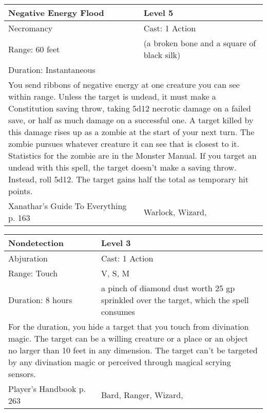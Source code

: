 \documentclass[11pt]{report}
\begin{document}
\begin{table}[H]
	\begin{tabular}{||p{6cm}|p{6cm}||}
		\hline\hline
		\bf{Negative Energy Flood} & Level 5\\ \hline
		Necromancy & Cast: 1 Action\\ \hline
		Range: 60 feet & (a broken bone and a square of black silk)\\ \hline
		Duration: Instantaneous & \\ \hline
		\multicolumn{2}{||p{12cm}||}{You send ribbons of negative energy at one creature you can see within range. Unless the target is undead, it must make a Constitution saving throw, taking 5d12 necrotic damage on a failed save, or half as much damage on a successful one. A target killed by this damage rises up as a zombie at the start of your next turn. The zombie pursues whatever creature it can see that is closest to it. Statistics for the zombie are in the Monster Manual. If you target an undead with this spell, the target doesn’t make a saving throw. Instead, roll 5d12. The target gains half the total as temporary hit points.}\\ \hline
Xanathar's Guide To Everything p. 163 & Warlock, Wizard, \\ \hline\hline
	\end{tabular}
\end{table}

\begin{table}[H]
	\begin{tabular}{||p{6cm}|p{6cm}||}
		\hline\hline
		\bf{Nondetection} & Level 3\\ \hline
		Abjuration & Cast: 1 Action\\ \hline
		Range: Touch & V, S, M\\ \hline
		Duration: 8 hours & a pinch of diamond dust worth 25 gp sprinkled over the target, which the spell consumes\\ \hline
		\multicolumn{2}{||p{12cm}||}{For the duration, you hide a target that you touch from divination magic.
The target can be a willing creature or a place or an object no larger than 10 feet in any dimension. The target can’t be targeted by any divination magic or perceived through magical scrying sensors.}\\ \hline
Player's Handbook p. 263 & Bard, Ranger, Wizard, \\ \hline\hline
	\end{tabular}
\end{table}
\end{document}
